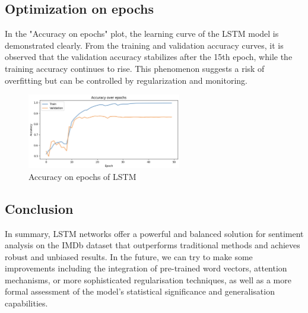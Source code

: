 \subsection{Optimization on epochs}
In the "Accuracy on epochs" plot, the learning curve of the LSTM model is demonstrated clearly. From the training and validation accuracy curves, it is observed that the validation accuracy stabilizes after the 15th epoch, while the training accuracy continues to rise. This phenomenon suggests a risk of overfitting but can be controlled by regularization and monitoring.

\begin{figure}[ht]
    \centering
    \includegraphics[width=0.6\textwidth]{pics/lstm_accuracy_s.png}
    \caption{Accuracy on epochs of LSTM}
\end{figure}

\subsection{Conclusion}
In summary, LSTM networks offer a powerful and balanced solution for sentiment analysis on the IMDb dataset that outperforms traditional methods and achieves robust and unbiased results. In the future, we can try to make some improvements including the integration of pre-trained word vectors, attention mechanisms, or more sophisticated regularisation techniques, as well as a more formal assessment of the model's statistical significance and generalisation capabilities.





